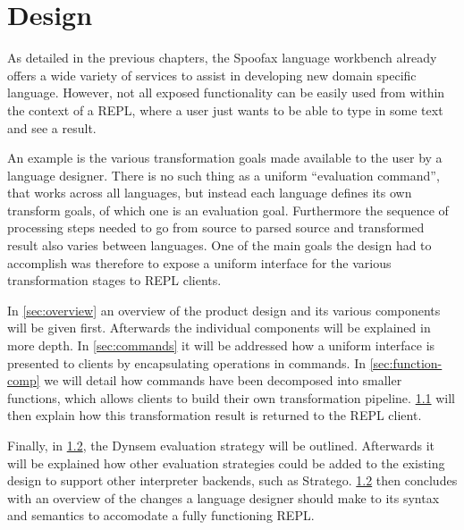 \chapter{Design}
\label{cha:design}

As detailed in the previous chapters, the Spoofax language workbench already
offers a wide variety of services to assist in developing new domain specific
language. However, not all exposed functionality can be easily used from within
the context of a REPL, where a user just wants to be able to type in some text
and see a result.

An example is the various transformation goals made available to the user by a
language designer. There is no such thing as a uniform ``evaluation command'',
that works across all languages, but instead each language defines its own
transform goals, of which one is an evaluation goal.  Furthermore the sequence
of processing steps needed to go from source to parsed source and transformed
result also varies between languages. One of the main goals the design had to
accomplish was therefore to expose a uniform interface for the various
transformation stages to REPL clients.

In \cref{sec:overview} an overview of the product design and its various
components will be given first. Afterwards the individual components will be
explained in more depth. In \cref{sec:commands} it will be addressed how a
uniform interface is presented to clients by encapsulating operations in
commands. In \cref{sec:function-comp} we will detail how commands have been
decomposed into smaller functions, which allows clients to build their own
transformation pipeline. \cref{sec:visitor} will then explain how this
transformation result is returned to the REPL client.

Finally, in \cref{sec:eval-strat}, the Dynsem evaluation strategy will be
outlined.  Afterwards it will be explained how other evaluation strategies
could be added to the existing design to support other interpreter backends,
such as Stratego. \cref{sec:eval-strat} then concludes with an overview of the
changes a language designer should make to its syntax and semantics to
accomodate a fully functioning REPL.







\section{}
\label{sec:visitor}

\section{}
\label{sec:eval-strat}

